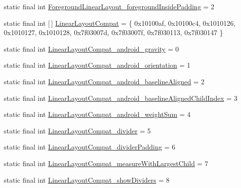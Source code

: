 \begin{DoxyCompactItemize}
\item 
static final int \mbox{\hyperlink{classandroid_1_1support_1_1design_1_1_r_1_1styleable_aec964b6f08ec7f414cf1fe5528278a0d}{Foreground\+Linear\+Layout\+\_\+foreground\+Inside\+Padding}} = 2
\item 
static final int \mbox{[}$\,$\mbox{]} \mbox{\hyperlink{classandroid_1_1support_1_1design_1_1_r_1_1styleable_a00b7e2da5bc1f659d80ac76716119713}{Linear\+Layout\+Compat}} = \{ 0x10100af, 0x10100c4, 0x1010126, 0x1010127, 0x1010128, 0x7f03007d, 0x7f03007f, 0x7f030113, 0x7f030147 \}
\item 
static final int \mbox{\hyperlink{classandroid_1_1support_1_1design_1_1_r_1_1styleable_a94fd5dcf64b530191f4c13699d3f209c}{Linear\+Layout\+Compat\+\_\+android\+\_\+gravity}} = 0
\item 
static final int \mbox{\hyperlink{classandroid_1_1support_1_1design_1_1_r_1_1styleable_ac3216c909a53d0d655295199b5db8bcc}{Linear\+Layout\+Compat\+\_\+android\+\_\+orientation}} = 1
\item 
static final int \mbox{\hyperlink{classandroid_1_1support_1_1design_1_1_r_1_1styleable_a22effd7a7321cd1d30a0fdf070aa0fd9}{Linear\+Layout\+Compat\+\_\+android\+\_\+baseline\+Aligned}} = 2
\item 
static final int \mbox{\hyperlink{classandroid_1_1support_1_1design_1_1_r_1_1styleable_a3709324492722be4a6bb1ec413a0b65c}{Linear\+Layout\+Compat\+\_\+android\+\_\+baseline\+Aligned\+Child\+Index}} = 3
\item 
static final int \mbox{\hyperlink{classandroid_1_1support_1_1design_1_1_r_1_1styleable_a318f80ff51afeb9607da24e1f3cd602d}{Linear\+Layout\+Compat\+\_\+android\+\_\+weight\+Sum}} = 4
\item 
static final int \mbox{\hyperlink{classandroid_1_1support_1_1design_1_1_r_1_1styleable_ac8f9cf041955a4a03a7828e19e0b5d6d}{Linear\+Layout\+Compat\+\_\+divider}} = 5
\item 
static final int \mbox{\hyperlink{classandroid_1_1support_1_1design_1_1_r_1_1styleable_aefe5390da1fa3772f1cabab70d820ada}{Linear\+Layout\+Compat\+\_\+divider\+Padding}} = 6
\item 
static final int \mbox{\hyperlink{classandroid_1_1support_1_1design_1_1_r_1_1styleable_ad27424b27e6cc866d087f59f8e75e3d6}{Linear\+Layout\+Compat\+\_\+measure\+With\+Largest\+Child}} = 7
\item 
static final int \mbox{\hyperlink{classandroid_1_1support_1_1design_1_1_r_1_1styleable_aef434d8f11ec28d28dd7fe7371c2b39e}{Linear\+Layout\+Compat\+\_\+show\+Dividers}} = 8

\end{DoxyCompactItemize}

